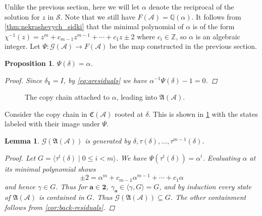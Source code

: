 \documentclass[12pt, letterpaper]{article}
\newcommand{\Z}{\mathbb Z}
\newcommand{\Q}{\mathbb Q}
\newcommand{\bin}{\mathbf 2}
\newcommand{\A}{\mathcal A}
\newcommand{\ch}[1]{\mathbf{#1}}
\newcommand{\res}[2]{{{#1}_{\ch{#2}}}}
\renewcommand{\S}{\mathcal S}
\newcommand{\comp}{\mathfrak C}
\newcommand{\princ}{\mathfrak A}
\newcommand{\gp}{\mathcal G}
\newtheorem{lemma}[thm]{Lemma}
\newtheorem{prop}[thm]{Proposition}
\begin{document}
Unlike the previous section, here we will let $\alpha$ denote the reciprocal of
the solution for $z$ in $\S$. Note that we still have $F(\A) = \Q(\alpha)$.
It follows from \cref{thm:nekrashevych_sidki} that the minimal polynomial of
$\alpha$ is of the form $\chi^{-1}(z) = z^m + c_{m-1}z^{m-1} + \cdots + c_1 z 
\pm 2$ where $c_i \in \Z$, so $\alpha$ is an algebraic integer.  Let $\Psi:
\gp(\A) \rightarrow F(\A)$ be the map constructed in the previous section.
\begin{prop}\label{prop:delta_alpha}
    $\Psi(\delta) = \alpha$.
    \begin{proof}
        Since $\res{\delta}{1} = I$, by \cref{eq:aresiduals}
        we have $\alpha^{-1} \Psi(\delta) - 1 = 0$.
    \end{proof}
\end{prop}

\begin{figure}[h]
    \centering
    \caption{The copy chain attached to $\alpha$, leading into $\princ(\A)$.}
    \label{fig:princ-copy-chain}
\end{figure}

Consider the copy chain in $\comp(\A)$ rooted at $\delta$. This is shown in
\cref{fig:princ-copy-chain} with the states labeled with their image under
$\Psi$.
\begin{lemma}\label{lemma:princ-copy-chain-gen}
    $\gp(\princ(\A))$ is generated by
    $\delta, \tau(\delta), \ldots, \tau^{m-1}(\delta)$.
    \begin{proof}
        Let $G = \langle \tau^i(\delta) \mid 0 \le i < m \rangle$.
        We have $\Psi(\tau^i(\delta)) = \alpha^i$. Evaluating $\alpha$ at its
        minimal polynomial shows
        \[
            \pm 2 = \alpha^m + c_{m-1}\alpha^{m-1} + \cdots + c_1 \alpha
        \]
        and hence $\gamma \in G$. Thus for $\ch{a} \in \bin$,
        $\res{\gamma}{a} \in \langle \gamma, G \rangle = G$, and by induction
        every state of $\princ(\A)$ is contained in $G$. Thus
        $\gp(\princ(\A)) \subseteq G$. The other containment follows from
        \cref{cor:back-residuals}.
    \end{proof}
\end{lemma}
\end{document}
